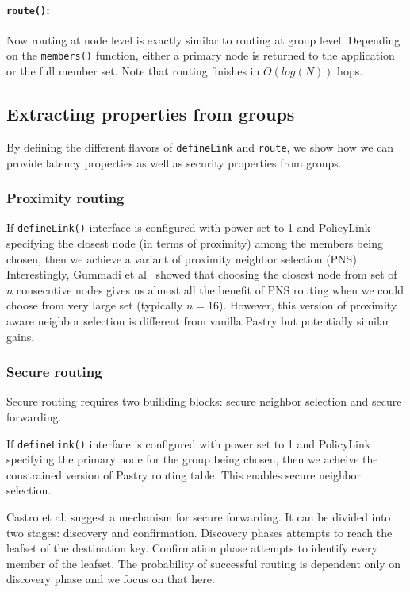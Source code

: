\paragraph{\texttt{route()}:} Now routing at node level is exactly similar to routing at group level. Depending on the \texttt{members()} function, either a primary node is returned to the application or the full member set. Note that routing finishes in $O(log(N))$ hops.

\subsection{Extracting properties from groups}
\label{sec:gaurantees_pastry}
By defining the different flavors of \texttt{defineLink} and \texttt{route}, we show how we can provide latency properties as well as security properties from groups.

\subsubsection{Proximity routing}
If \texttt{defineLink()} interface is configured with power set to 1 and PolicyLink specifying the closest node (in terms of proximity) among the members being chosen, then we achieve a variant of proximity neighbor selection (PNS). Interestingly, Gummadi et al~\cite{routing_geometry_sigcomm_03} showed that choosing the closest node from set of $n$ consecutive nodes gives us almost all the benefit of PNS routing when we could choose from very large set (typically $n=16$). However, this version of proximity aware neighbor selection is different from vanilla Pastry but potentially similar gains.


\subsubsection{Secure routing}
Secure routing requires two builiding blocks: secure neighbor selection and secure forwarding.

If \texttt{defineLink()} interface is configured with power set to 1 and PolicyLink specifying the primary node for the group being chosen, then we acheive the constrained version of Pastry routing table. This enables secure neighbor selection.

Castro et al. suggest a mechanism for secure forwarding. It can be divided into two stages: discovery and confirmation. Discovery phases attempts to reach the leafset of the destination key. Confirmation phase attempts to identify every member of the leafset. The probability of successful routing is dependent only on discovery phase and we focus on that here.

